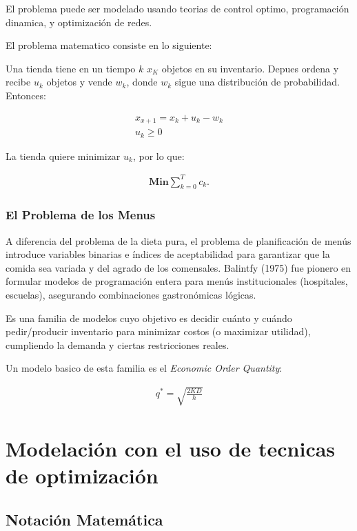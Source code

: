 \documentclass[12pt]{report}
\begin{document}
El problema puede ser modelado usando teorias de control optimo, programación dinamica, y optimización de redes. 

El problema matematico consiste en lo siguiente:

Una tienda tiene en un tiempo $k$ $x_K$ objetos en su inventario. Depues ordena y recibe  $u_k$ objetos y vende $w_k$, donde $w_k$ sigue una distribución de probabilidad. Entonces:

\begin{align}
  x_{x+1}=x_k+u_k-w_k\\
  u_k\geq 0
\end{align}

La tienda quiere minimizar $u_k$, por lo que:

\begin{align}
  \mathbf{Min}\sum_{k=0}^{T}c_k.
\end{align}\autocite{enwiki:1187845455}


\subsection{El Problema de los Menus}
A diferencia del problema de la dieta pura, el problema de planificación de menús introduce variables binarias e índices de aceptabilidad para garantizar que la comida sea variada y del agrado de los comensales. Balintfy (1975) fue pionero en formular modelos de programación entera para menús institucionales (hospitales, escuelas), asegurando combinaciones gastronómicas lógicas.

Es una familia de modelos cuyo objetivo es decidir cuánto y cuándo pedir/producir inventario para minimizar costos (o maximizar utilidad), cumpliendo la demanda y ciertas restricciones reales.

Un modelo basico de esta familia es el \textit{Economic Order Quantity}:

\begin{align}
  q^* = \sqrt{\frac{2KD}{h}}
\end{align}


\chapter{Modelación con el uso de tecnicas de optimización}

\section{Notación Matemática}
\end{document}
